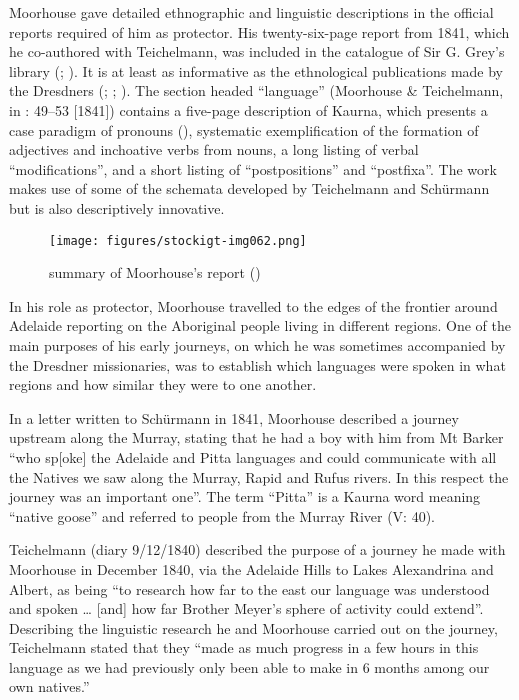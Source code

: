 Moorhouse gave detailed ethnographic and linguistic descriptions in the official reports required of him as protector. His twenty-six-page report from 1841, which he co-authored with Teichelmann, was included in the catalogue of Sir G. Grey’s library (\citealt[5]{bleek_library_1858}; ). It is at least as informative as the ethnological publications made by the Dresdners (\citealt{teichelmann_aboriginals_1841}; \citealt{schurmann_letter_1844}; \citealt{meyer_manners_1846}). The section headed “language” (Moorhouse \& Teichelmann, in \citet{foster_two_1990}: 49--53 [1841]) contains a five-page description of Kaurna, which presents a case paradigm of pronouns (), systematic exemplification of the formation of adjectives and inchoative verbs from nouns, a long listing of verbal ``modifications'', and a short listing of “postpositions” and ``postfixa''. The work makes use of some of the schemata developed by Teichelmann and Schürmann but is also descriptively innovative.


\begin{figure}
\texttt{[image: figures/stockigt-img062.png]}
\caption{ summary of Moorhouse’s report (\citeyear{moorhouse1842})}
\label{fig:key:116}
\end{figure}

In his role as protector, Moorhouse travelled to the edges of the frontier around Adelaide reporting on the Aboriginal people living in different regions. One of the main purposes of his early journeys, on which he was sometimes accompanied by the Dresdner missionaries, was to establish which languages were spoken in what regions and how similar they were to one another.

In a letter written to Schürmann in 1841, Moorhouse described a journey upstream along the Murray, stating that he had a boy with him from Mt Barker “who sp[oke] the Adelaide and Pitta languages and could communicate with all the Natives we saw along the Murray, Rapid and Rufus rivers. In this respect the journey was an important one”. The term “Pitta” is a Kaurna word meaning “native goose” and referred to people from the Murray River (\citealt{teichelmann_outlines_1840}V: 40).

Teichelmann (diary 9/12/1840) described the purpose of a journey he made with Moorhouse in December 1840, via the Adelaide Hills to Lakes Alexandrina and Albert, as being “to research how far to the east our language was understood and spoken … [and] how far Brother Meyer’s sphere of activity could extend”. Describing the linguistic research he and Moorhouse carried out on the journey, Teichelmann stated that they “made as much progress in a few hours in this language as we had previously only been able to make in 6 months among our own natives.”

